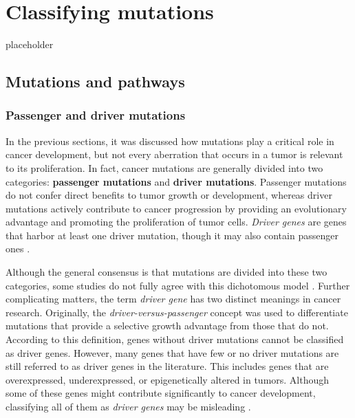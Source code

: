 \chapter{Classifying mutations} \label{chap:classifying_mutations}


placeholder 

\section{Mutations and pathways}

\subsection{Passenger and driver mutations}

In the previous sections, it was discussed how mutations play a critical role in cancer development, but not every aberration that occurs in a tumor is relevant to its proliferation. In fact, cancer mutations are generally divided into two categories: \textbf{passenger mutations} and \textbf{driver mutations}. Passenger mutations do not confer direct benefits to tumor growth or development, whereas driver mutations actively contribute to cancer progression by providing an evolutionary advantage and promoting the proliferation of tumor cells. \textit{Driver genes} are genes that harbor at least one driver mutation, though it may also contain passenger ones \cite{vogelstein2013}.

Although the general consensus is that mutations are divided into these two categories, some studies do not fully agree with this dichotomous model \cite{three_mutations}. Further complicating matters, the term \textit{driver gene} has two distinct meanings in cancer research. Originally, the \textit{driver-versus-passenger} concept was used to differentiate mutations that provide a selective growth advantage from those that do not. According to this definition, genes without driver mutations cannot be classified as driver genes. However, many genes that have few or no driver mutations are still referred to as driver genes in the literature. This includes genes that are overexpressed, underexpressed, or epigenetically altered in tumors. Although some of these genes might contribute significantly to cancer development, classifying all of them as \textit{driver genes} may be misleading \cite{vogelstein2013}.

